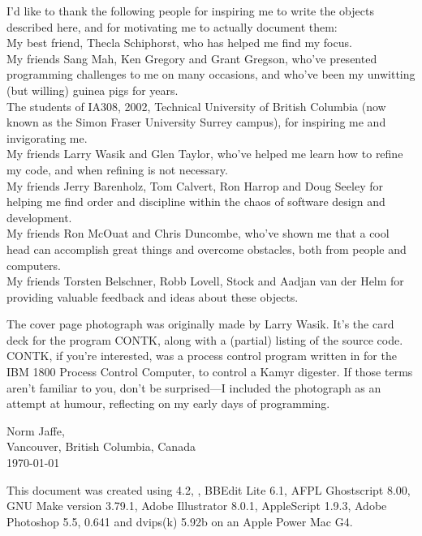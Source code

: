 \newpage
I'd like to thank the following people for inspiring me to write the objects described here, and for motivating me to actually
document them:\\
My best friend, Thecla Schiphorst, who has helped me find my focus.\\
My friends Sang Mah, Ken Gregory and Grant Gregson, who've presented \MaxName{} programming challenges to me on many occasions, and
who've been my unwitting (but willing) guinea pigs for years.\\
The students of IA308, 2002, Technical University of British Columbia (now known as the Simon Fraser University Surrey campus),
for inspiring me and invigorating me.\\
My friends Larry Wasik and Glen Taylor, who've helped me learn how to refine my code, and when refining is not necessary.\\
My friends Jerry Barenholz, Tom Calvert, Ron Harrop and Doug Seeley for helping me find order and discipline within the chaos
of software design and development.\\
My friends Ron McOuat and Chris Duncombe, who've shown me that a cool head can accomplish great things and overcome obstacles,
both from people and computers.\\
My friends Torsten Belschner, Robb Lovell, Stock and Aadjan van der Helm for providing valuable feedback and ideas about
these objects.

\vspace{1ex}
The cover page photograph was originally made by Larry Wasik.
It's the card deck for the program CONTK, along with a (partial) listing of the source code.
CONTK, if you're interested, was a process control program written in  for the IBM 1800 Process Control Computer,
to control a Kamyr digester.
If those terms aren't familiar to you, don't be surprised---I included the photograph as an attempt at humour, reflecting on
my early days of programming.

\vspace{1ex}
\begin{flushleft}
Norm Jaffe,\\
Vancouver, British Columbia, Canada\\
\today
\end{flushleft}

\vspace{\fill}

This document was created using  4.2, , BBEdit Lite 6.1,
AFPL Ghostscript 8.00, GNU Make version 3.79.1, Adobe Illu\-stra\-tor\textregistered{} 8.0.1, AppleScript 1.9.3,
Adobe\textregistered{} Photoshop\textregistered{} 5.5,
 0.641 and dvips(k) 5.92b on an Apple Power Mac G4.

\objEnd{}
